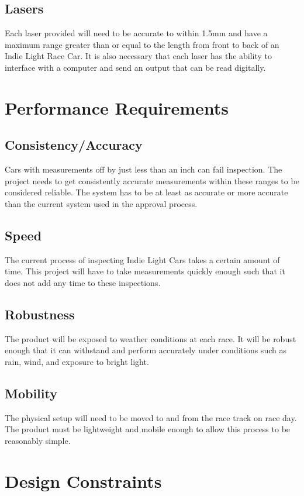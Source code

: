 \documentclass[draftclsnofoot,onecolumn,letterpaper,10pt,compsoc]{IEEEtran}
\begin{document}
\subsection{Lasers}
Each laser provided will need to be accurate to within 1.5mm and have a maximum range greater than or equal to the length from front to back of an Indie Light Race Car.  It is also necessary that each laser has the ability to interface with a computer and send an output that can be read digitally.

\section{Performance Requirements}

\subsection{Consistency/Accuracy}
Cars with measurements off by just less than an inch can fail inspection.  The project needs to get consistently accurate measurements within these ranges to be considered reliable.  The system has to be at least as accurate or more accurate than the current system used in the approval process.
\subsection{Speed}
The current process of inspecting Indie Light Cars takes a certain amount of time.  This project will have to take measurements quickly enough such that it does not add any time to these inspections.
\subsection{Robustness}
The product will be exposed to weather conditions at each race.  It will be robust enough that it can withstand and perform accurately under conditions such as rain, wind, and exposure to bright light.
\subsection{Mobility}
The physical setup will need to be moved to and from the race track on race day.  The product must be lightweight and mobile enough to allow this process to be reasonably simple.

\section{Design Constraints}
\end{document}
